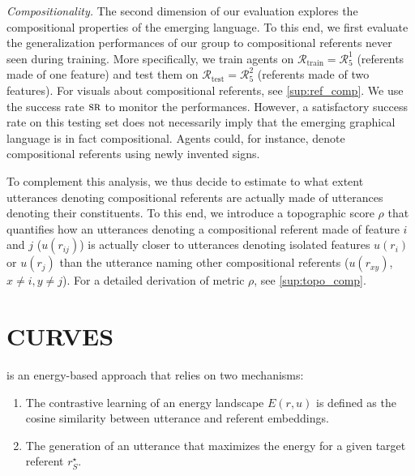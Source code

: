 \textit{Compositionality. } The second dimension of our evaluation explores the compositional properties of the emerging language. To this end, we first evaluate the generalization performances of our group to compositional referents never seen during training. More specifically, we train agents on $\mathcal{R}_{\text{train}} = \mathcal{R}_5^1$ (referents made of one feature) and test them on $\mathcal{R}_{\text{test}}=\mathcal{R}_5^2$ (referents made of two features). For visuals about compositional referents, see \ap\ref{sup:ref_comp}. We use the success rate $\textsc{sr}$ to monitor the performances. However, a satisfactory success rate on this testing set does not necessarily imply that the emerging graphical language is in fact compositional. Agents could, for instance, denote compositional referents using newly invented signs.

To complement this analysis, we thus decide to estimate to what extent utterances denoting compositional referents are actually made of utterances denoting their constituents. To this end, we introduce a topographic score $\rho$ that quantifies how an utterances denoting a compositional referent made of feature $i$ and $j$ ($u(r_{ij})$) is actually closer to utterances denoting isolated features $u(r_i)$ or $u(r_j)$ than the utterance naming other compositional referents ($u(r_{xy})$, $x\neq i, y\neq j$). For a detailed derivation of metric $\rho$, see \ap\ref{sup:topo_comp}.

\section{CURVES}


\curves is an energy-based approach that relies on two mechanisms:
\begin{enumerate}[noitemsep,topsep=0pt]
\item  The contrastive learning of an energy landscape $E(r,u)$ is defined as the cosine similarity between utterance and referent embeddings.
\item The generation of an utterance that maximizes the energy for a given target referent $r^\star_S$.
\end{enumerate}

